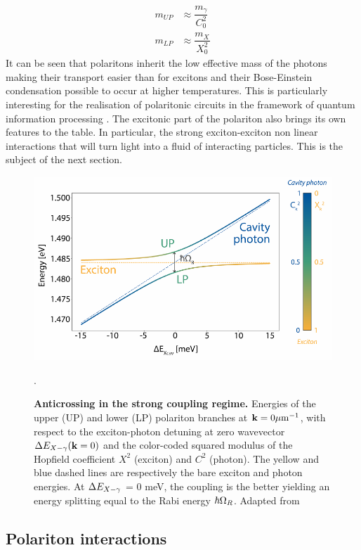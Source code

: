 \begin{subequations}
    \begin{align}
    m_{UP} &\approx\dfrac{m_\gamma}{C_0^2} \\
    m_{LP} &\approx\dfrac{m_X}{X_0^2}
    \end{align}
    \label{eq:polariton_effective_mass}
\end{subequations}
It can be seen that polaritons inherit the low effective mass of the photons making their transport easier than for excitons and their Bose-Einstein condensation possible to occur at higher temperatures.
This is particularly interesting for the realisation of polaritonic circuits in the framework of quantum information processing \cite{liew_optical_circuit_2008}.
The excitonic part of the polariton also brings its own features to the table. In particular, the strong exciton-exciton non linear interactions that
will turn light into a fluid of interacting particles. This is the subject of the next section.
\begin{figure}[h]
    \centering
    \includegraphics[width=0.75\linewidth]{chap_theory/fig/anticrossing.pdf}
    \caption{\textbf{Anticrossing in the strong coupling regime.} Energies of the upper (UP) and lower (LP) polariton branches at $\mathbf{k} = 0 \mathrm{\mu m^{-1}}$, with respect to the exciton-photon detuning at zero wavevector $\Delta E_{X-\gamma}(\mathbf{k}=0)$ and the color-coded squared modulus of the Hopfield coefficient $X^2$ (exciton) and $C^2$ (photon). The yellow and blue dashed lines are respectively the bare exciton and photon energies. 
    At $\Delta E_{X-\gamma}$ = 0 meV, the coupling is the better yielding an energy splitting equal to the Rabi energy $\hbar \Omega_R$. Adapted from \cite{maitre_thesis}}. 
    \label{fig:anticrossing}
\end{figure}

\subsection{Polariton interactions}
\label{sub:polariton_interactions}


